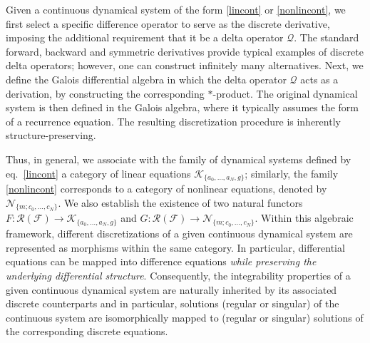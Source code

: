 \documentclass[10pt]{amsart}
\numberwithin{equation}{section}
\theoremstyle{definition}
\begin{document}
Given a continuous dynamical system of the form  \eqref{lincont} or \eqref{nonlincont}, we first select a specific difference operator to serve
as the discrete derivative, imposing the additional requirement that it
be a delta operator $\mathcal{Q}$. The standard forward, backward and symmetric
derivatives provide typical examples of discrete delta operators; however,
one can construct infinitely many alternatives. Next, we define the Galois
differential algebra in which the delta operator $\mathcal{Q}$ acts as
a derivation, by constructing the corresponding $*$-product. The original
dynamical system is then defined in the Galois algebra, where it typically
assumes the form of a recurrence equation. The resulting discretization
procedure is inherently structure-preserving.

Thus, in general, we associate with the family of dynamical systems defined
by eq.~\eqref{lincont} a category of linear equations
$\mathcal{K}_{\{ a_{0},\ldots , a_{N},g \}}$; similarly, the family  \eqref{nonlincont} corresponds to a category of nonlinear equations, denoted
by $\mathcal{N}_{\{m; c_{0},\ldots , c_{N}\}}$. We also establish the existence
of two natural functors
$F: \mathcal{R}(\mathcal{F}) \longrightarrow \mathcal{K}_{\{ a_{0},
\ldots , a_{N},g \}}$ and
$G: \mathcal{R}(\mathcal{F}) \longrightarrow \mathcal{N}_{\{ m; c_{0},
\ldots , c_{N} \}}$. Within this algebraic framework, different discretizations
of a given continuous dynamical system are represented as morphisms within
the same category. In particular, differential equations can be mapped
into difference equations
\textit{while preserving the underlying differential structure}. Consequently,
the integrability properties of a given continuous dynamical system are
naturally inherited by its associated discrete counterparts and in particular,
solutions (regular or singular) of the continuous system are isomorphically
mapped to (regular or singular) solutions of the corresponding discrete
equations.
\end{document}
